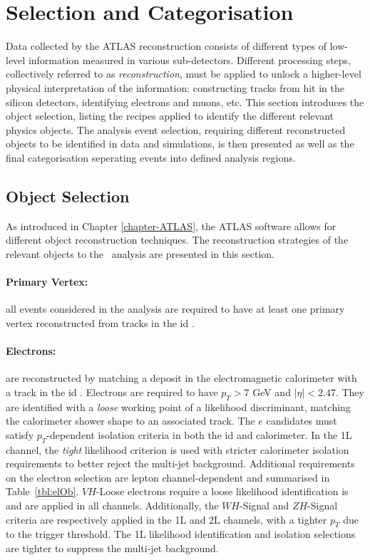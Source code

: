 
\section{Selection and Categorisation}\label{sec-selectionandcat}
Data collected by the ATLAS reconstruction consists of different types of low-level information measured in various sub-detectors. Different processing steps, collectively referred to as \textit{reconstruction}, must be applied to unlock a higher-level physical interpretation of the information: constructing tracks from hit in the silicon detectors, identifying electrons and muons, etc. This section introduces the object selection, listing the recipes applied to identify the different relevant physics objects. The analysis event selection, requiring different reconstructed objects to be identified in data and simulations, is then presented as well as the final categorisation seperating events into defined analysis regions.

\subsection{Object Selection}\label{sec-obj}%
As introduced in Chapter \ref{chapter-ATLAS}, the ATLAS software allows for different object reconstruction techniques. The reconstruction strategies of the relevant objects to the \vhbc\ analysis are presented in this section. 

\paragraph{Primary Vertex:} all events considered in the analysis are required to have at least one primary vertex reconstructed from tracks in the \gls{id} \cite{ATL-PHYS-PUB-2015-026}.

\paragraph{Electrons:} are reconstructed by matching a deposit in the electromagnetic calorimeter with a track in the \gls{id} \cite{Aaboud:2657964, Aad_2019}. Electrons are required to have $p_T > 7$ GeV and $|\eta|<2.47$. They are identified with a \textit{loose} working point of a likelihood discriminant, matching the calorimeter shower shape to an associated track. The $e$ candidates must satisfy $p_T$-dependent isolation criteria in both the \gls{id} and calorimeter. In the 1L channel, the \textit{tight} likelihood criterion is used with stricter calorimeter isolation requirements to better reject the multi-jet background. Additional requirements on the electron selection are lepton channel-dependent and summarised in Table~\ref{tbl:elOb}. $VH$-Loose electrons require a loose likelihood identification is and are applied in all channels. Additionally, the $WH$-Signal and $ZH$-Signal criteria are respectively applied in the 1L and 2L channels, with a tighter $p_T$ due to the trigger threshold. The 1L likelihood identification and isolation selections are tighter to suppress the multi-jet background. %

